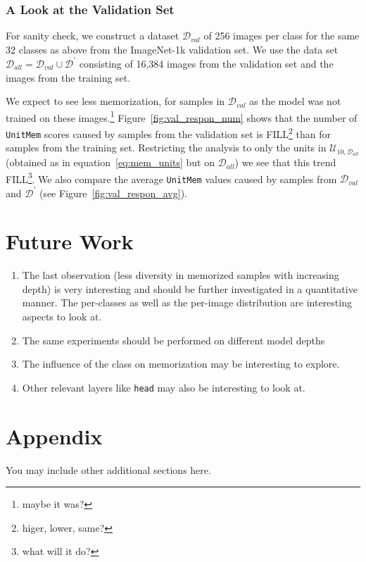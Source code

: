 \documentclass{article} %
\begin{document}
\subsubsection{A Look at the Validation Set}
For sanity check, we construct a dataset $\mathcal{D}_{val}$ of 256 images per class for the same 32 classes as above from the ImageNet-1k validation set.
We use the data set $\mathcal{D}_{all} = \mathcal{D}_{val} \cup \mathcal{D}^\prime$ consisting of 16,384 images from the validation set and the images from the training set.

We expect to see less memorization, for samples in $\mathcal{D}_{val}$ as the model was not trained on these images.\footnote{maybe it was?}
Figure~\ref{fig:val_respon_num} shows that the number of \texttt{UnitMem} scores caused by samples from the validation set is FILL\footnote{higer, lower, same?} than for samples from the training set.
Restricting the analysis to only the units in $\mathcal{U}_{10,\mathcal{D}_{all}}$ (obtained as in equation~\ref{eq:mem_units} but on $\mathcal{D}_{all}$) we see that this trend FILL\footnote{what will it do?}.
We also compare the average \texttt{UnitMem} values caused by samples from $\mathcal{D}_{val}$ and $\mathcal{D}^\prime$ (see Figure~\ref{fig:val_respon_avg}).

\section{Future Work}
\begin{enumerate}
   \item The last observation (less diversity in memorized samples with increasing depth) is very interesting and should be further investigated in a quantitative manner.
   The per-classes as well as the per-image distribution are interesting aspects to look at.
   \item The same experiments should be performed on different model depths
   \item The influence of the class on memorization may be interesting to explore.
   \item Other relevant layers like \texttt{head} may also be interesting to look at.
\end{enumerate}






\appendix
\section{Appendix}
You may include other additional sections here.
\end{document}
